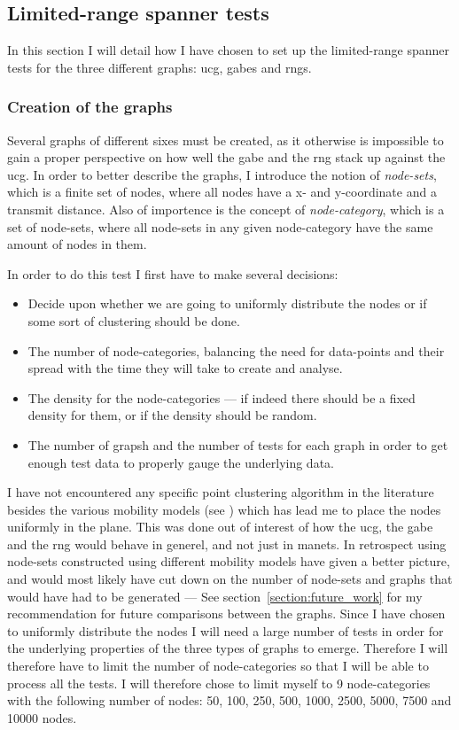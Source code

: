 \subsection{Limited-range spanner tests}
\label{section:test_desc_spanners}
In this section I will detail how I have chosen to set up the limited-range spanner tests for the three different graphs: \ac{ucg}, \acp{gabe} and \acp{rng}.

\subsubsection{Creation of the graphs}
Several graphs of different sixes must be created, as it otherwise is impossible to gain a proper perspective on how well the \ac{gabe} and the \ac{rng} stack up against the \ac{ucg}. In order to better describe the graphs, I introduce the notion of \emph{node-sets}, which is a finite set of nodes, where all nodes have a x- and y-coordinate and a transmit distance. Also of importence is the concept of \emph{node-category}, which is a set of node-sets, where all node-sets in any given node-category have the same amount of nodes in them. 

In order to do this test I first have to make several decisions:
\begin{itemize}
\item Decide upon whether we are going to uniformly distribute the nodes or if some sort of clustering should be done. 
\item The number of node-categories, balancing the need for data-points and their spread with the time they will take to create and analyse.
\item The density for the node-categories --- if indeed there should be a fixed density for them, or if the density should be random.
\item The number of grapsh and the number of tests for each graph in order to get enough test data to properly gauge the underlying data.
\end{itemize}

I have not encountered any specific point clustering algorithm in the literature besides the various mobility models (see \cite{disasterArea, MobilityAdHocResearch}) which has lead me to place the nodes uniformly in the plane. This was done out of interest of how the \ac{ucg}, the \ac{gabe} and the \ac{rng} would behave in generel, and not just in \acp{manet}. In retrospect using node-sets constructed using different  mobility models have given a better picture, and would most likely have cut down on the number of node-sets and graphs that would have had to be generated --- See section~\ref{section:future_work} for my recommendation for future comparisons between the graphs.   
Since I have chosen to uniformly distribute the nodes I will need a large number of tests in order for the underlying properties of the three types of graphs to emerge. Therefore I will therefore have to limit the number of node-categories so that I will be able to process all the tests. I will therefore chose to limit myself to 9 node-categories with the following number of nodes: 50, 100, 250, 500, 1000, 2500, 5000, 7500 and 10000 nodes.

